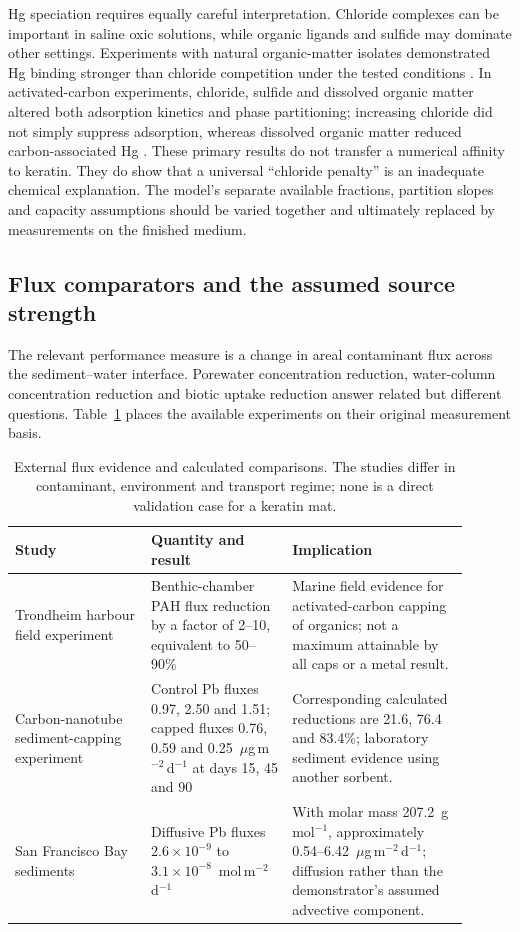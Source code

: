 Hg speciation requires equally careful interpretation. Chloride complexes can be important in saline oxic solutions, while organic ligands and sulfide may dominate other settings. Experiments with natural organic-matter isolates demonstrated Hg binding stronger than chloride competition under the tested conditions \citep{benoit2001}. In activated-carbon experiments, chloride, sulfide and dissolved organic matter altered both adsorption kinetics and phase partitioning; increasing chloride did not simply suppress adsorption, whereas dissolved organic matter reduced carbon-associated Hg \citep{chen2020}. These primary results do not transfer a numerical affinity to keratin. They do show that a universal ``chloride penalty'' is an inadequate chemical explanation. The model's separate available fractions, partition slopes and capacity assumptions should be varied together and ultimately replaced by measurements on the finished medium.

\subsection{Flux comparators and the assumed source strength}

The relevant performance measure is a change in areal contaminant flux across the sediment--water interface. Porewater concentration reduction, water-column concentration reduction and biotic uptake reduction answer related but different questions. Table~\ref{tab:flux-evidence} places the available experiments on their original measurement basis.

\begin{table}[htbp]
\centering\small
\caption{External flux evidence and calculated comparisons. The studies differ in contaminant, environment and transport regime; none is a direct validation case for a keratin mat.}
\label{tab:flux-evidence}
\begin{tabular}{p{0.27\linewidth}p{0.28\linewidth}p{0.35\linewidth}}
\toprule
Study & Quantity and result & Implication \\
\midrule
Trondheim harbour field experiment \citep{cornelissen2011} & Benthic-chamber PAH flux reduction by a factor of 2--10, equivalent to 50--90\% & Marine field evidence for activated-carbon capping of organics; not a maximum attainable by all caps or a metal result. \\
Carbon-nanotube sediment-capping experiment \citep{chen2025} & Control Pb fluxes 0.97, 2.50 and 1.51; capped fluxes 0.76, 0.59 and 0.25~$\mu$g\,m$^{-2}$\,d$^{-1}$ at days 15, 45 and 90 & Corresponding calculated reductions are 21.6, 76.4 and 83.4\%; laboratory sediment evidence using another sorbent. \\
San Francisco Bay sediments \citep{rivera1994} & Diffusive Pb fluxes $2.6\times10^{-9}$ to $3.1\times10^{-8}$~mol\,m$^{-2}$\,d$^{-1}$ & With molar mass 207.2~g\,mol$^{-1}$, approximately 0.54--6.42~$\mu$g\,m$^{-2}$\,d$^{-1}$; diffusion rather than the demonstrator's assumed advective component. \\
\bottomrule
\end{tabular}
\end{table}

